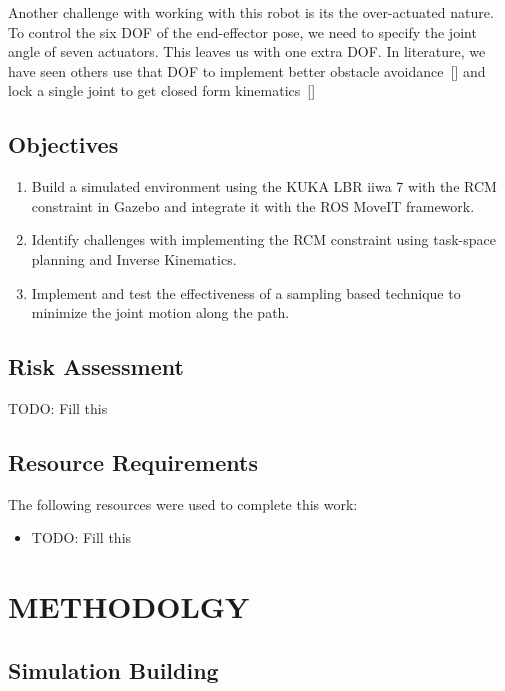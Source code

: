 \documentclass[BTech]{iitmdiss}
\begin{document}
    Another challenge with working with this robot is its the over-actuated nature.
    To control the six DOF of the end-effector pose, we need to specify the joint angle of seven actuators.
    This leaves us with one extra DOF.
    In literature, we have seen others use that DOF to implement better obstacle avoidance~[\cite{Doliwa_2020}] and lock a single joint to get closed form kinematics~[\cite{Asthana}]


    \section{Objectives}

    \begin{enumerate}
        \item Build a simulated environment using the KUKA LBR iiwa 7 with the RCM constraint in Gazebo and integrate it with the ROS MoveIT framework.
        \item Identify challenges with implementing the RCM constraint using task-space planning and Inverse Kinematics.
        \item Implement and test the effectiveness of a sampling based technique to minimize the joint motion along the path.
    \end{enumerate}


    \section{Risk Assessment}

    TODO: Fill this


    \section{Resource Requirements}
    The following resources were used to complete this work:
    \begin{itemize}
        \item TODO: Fill this
    \end{itemize}


    \chapter{METHODOLGY}\label{ch:method}


    \section{Simulation Building}
\end{document}
